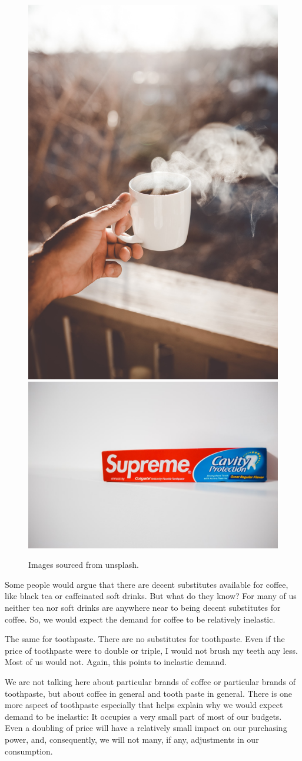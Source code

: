 \documentclass[
]{book}
\begin{document}
\begin{figure}

{\centering \includegraphics[width=0.45\linewidth]{img/demand/fig6} \includegraphics[width=0.45\linewidth]{img/demand/fig6b} 

}

\caption{Images sourced from unsplash.}\label{fig:demand06}
\end{figure}

Some people would argue that there are decent substitutes available for coffee, like black tea or caffeinated soft drinks. But what do they know? For many of us neither tea nor soft drinks are anywhere near to being decent substitutes for coffee. So, we would expect the demand for coffee to be relatively inelastic.

The same for toothpaste. There are no substitutes for toothpaste. Even if the price of toothpaste were to double or triple, I would not brush my teeth any less. Most of us would not. Again, this points to inelastic demand.

We are not talking here about particular brands of coffee or particular brands of toothpaste, but about coffee in general and tooth paste in general. There is one more aspect of toothpaste especially that helps explain why we would expect demand to be inelastic: It occupies a very small part of most of our budgets. Even a doubling of price will have a relatively small impact on our purchasing power, and, consequently, we will not many, if any, adjustments in our consumption.
\end{document}

